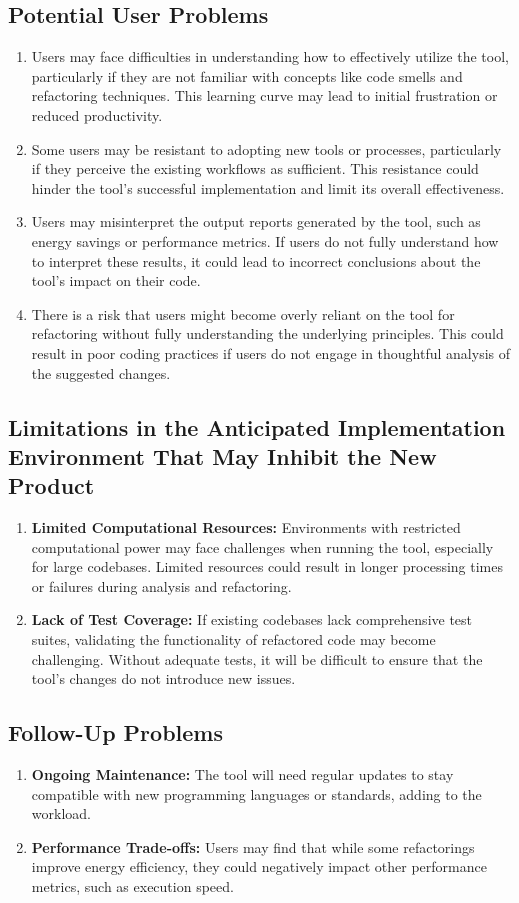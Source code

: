 \documentclass[12pt]{article}
\begin{document}
\subsection{Potential User Problems}
\begin{enumerate}
  \item Users may face difficulties in understanding how to
    effectively utilize the tool, particularly if they are not
    familiar with concepts like code smells and refactoring
    techniques. This learning curve may lead to initial frustration
    or reduced productivity.
  \item Some users may be resistant to adopting new tools or
    processes, particularly if they perceive the existing workflows
    as sufficient. This resistance could hinder the tool's successful
    implementation and limit its overall effectiveness.
  \item Users may misinterpret the output reports generated by the
    tool, such as energy savings or performance metrics. If users do
    not fully understand how to interpret these results, it could
    lead to incorrect conclusions about the tool's impact on their code.
  \item There is a risk that users might become overly reliant on the
    tool for refactoring without fully understanding the underlying
    principles. This could result in poor coding practices if users
    do not engage in thoughtful analysis of the suggested changes.
\end{enumerate}
\subsection{Limitations in the Anticipated Implementation Environment That May
Inhibit the New Product}
\begin{enumerate}
  \item \textbf{Limited Computational Resources:} Environments with
    restricted computational power may face challenges when running
    the tool, especially for large codebases. Limited resources could
    result in longer processing times or failures during analysis and
    refactoring.
  \item \textbf{Lack of Test Coverage:} If existing codebases lack
    comprehensive test suites, validating the functionality of
    refactored code may become challenging. Without adequate tests,
    it will be difficult to ensure that the tool's changes do not
    introduce new issues.
\end{enumerate}
\subsection{Follow-Up Problems}
\begin{enumerate}
  \item \textbf{Ongoing Maintenance:} The tool will need regular
    updates to stay compatible with new programming languages or
    standards, adding to the workload.
  \item \textbf{Performance Trade-offs:} Users may find that while
    some refactorings improve energy efficiency, they could
    negatively impact other performance metrics, such as execution speed.
\end{enumerate}
\end{document}
